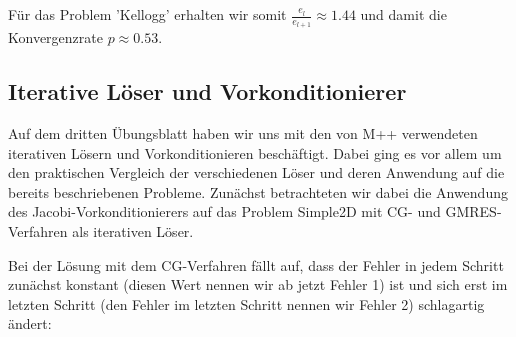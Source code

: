 \documentclass[12pt,a4paper]{scrartcl}
\newcommand{\R}{\mathbb{R}}
\DeclareMathOperator{\dive}{div}
\numberwithin{equation}{section}
\begin{document}
\begin{enumerate}[label=(\roman*)]
\begin{figure}[H]
\end{figure}

Für das Problem 'Kellogg' erhalten wir somit $ \frac{e_l}{e_{l+1}} \approx 1.44 $ und damit die Konvergenzrate $p \approx 0.53$.

%




\end{enumerate}

\subsection{Iterative Löser und Vorkonditionierer}

Auf dem dritten Übungsblatt haben wir uns mit den von M++ verwendeten iterativen Lösern und Vorkonditionieren beschäftigt.
Dabei ging es vor allem um den praktischen Vergleich der verschiedenen Löser und deren Anwendung auf die bereits beschriebenen Probleme.
Zunächst betrachteten wir dabei die Anwendung des Jacobi-Vorkonditionierers auf das Problem Simple2D mit CG- und GMRES-Verfahren als iterativen Löser.

Bei der Lösung mit dem CG-Verfahren fällt auf, dass der Fehler in jedem Schritt zunächst konstant (diesen Wert nennen wir ab jetzt Fehler 1) ist und sich erst im letzten Schritt (den Fehler im letzten Schritt nennen wir Fehler 2) schlagartig ändert:
\end{document}
